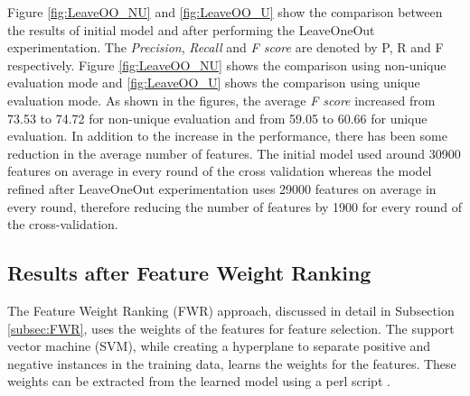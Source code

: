 Figure \ref{fig:LeaveOO_NU} and \ref{fig:LeaveOO_U} show the comparison between the results of initial model and after performing the LeaveOneOut experimentation.  The \textit{Precision}, \textit{Recall} and \textit{F score} are denoted by P, R and F respectively. Figure \ref{fig:LeaveOO_NU} shows the comparison using non-unique evaluation mode and \ref{fig:LeaveOO_U} shows the comparison using unique evaluation mode. As shown in the figures, the average \textit{F score} increased from 73.53 to 74.72 for non-unique evaluation and from 59.05 to 60.66 for unique evaluation. In addition to the increase in the performance, there has been some reduction in the average number of features. The initial model used around 30900 features on average in every round of the cross validation whereas the model refined after LeaveOneOut experimentation uses 29000 features on average in every round, therefore reducing the number of features by 1900 for every round of the cross-validation.

\subsection{Results after Feature Weight Ranking}

The Feature Weight Ranking (FWR) approach, discussed in detail in Subsection \ref{subsec:FWR}, uses the weights of the features for feature selection. The support vector machine (SVM), while creating a hyperplane to separate positive and negative instances in the training data, learns the weights for the features. These weights can be extracted from the learned model using a perl script \cite{svmlightonline}.


